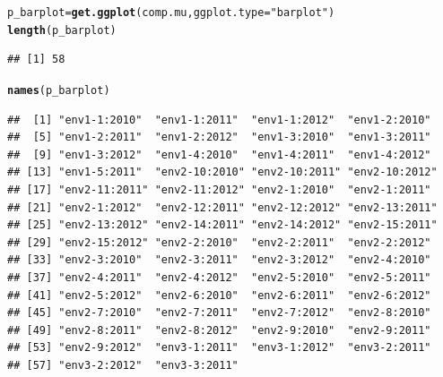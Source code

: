 \documentclass{article}\usepackage[]{graphicx}\usepackage[]{color}
\makeatletter
\newcommand{\hlstr}[1]{\textcolor[rgb]{0.192,0.494,0.8}{#1}}%
\newcommand{\hlstd}[1]{\textcolor[rgb]{0.345,0.345,0.345}{#1}}%
\newcommand{\hlkwb}[1]{\textcolor[rgb]{0.69,0.353,0.396}{#1}}%
\newcommand{\hlkwc}[1]{\textcolor[rgb]{0.333,0.667,0.333}{#1}}%
\newcommand{\hlkwd}[1]{\textcolor[rgb]{0.737,0.353,0.396}{\textbf{#1}}}%
\newenvironment{kframe}{%
 \def\at@end@of@kframe{}%
 \ifinner\ifhmode%
  \def\at@end@of@kframe{\end{minipage}}%
  \begin{minipage}{\columnwidth}%
 \fi\fi%
 \def\FrameCommand##1{\hskip\@totalleftmargin \hskip-\fboxsep
 \colorbox{shadecolor}{##1}\hskip-\fboxsep
     \hskip-\linewidth \hskip-\@totalleftmargin \hskip\columnwidth}%
 \MakeFramed {\advance\hsize-\width
   \@totalleftmargin\z@ \linewidth\hsize
   \@setminipage}}%
 {\par\unskip\endMakeFramed%
 \at@end@of@kframe}
\newenvironment{knitrout}{}{} %
\makeatother
\begin{document}
\begin{knitrout}
\color{fgcolor}\begin{kframe}
\begin{alltt}
\hlstd{p_barplot} \hlkwb{=} \hlkwd{get.ggplot}\hlstd{(comp.mu,} \hlkwc{ggplot.type} \hlstd{=} \hlstr{"barplot"}\hlstd{)}
\hlkwd{length}\hlstd{(p_barplot)}
\end{alltt}
\begin{verbatim}
## [1] 58
\end{verbatim}
\begin{alltt}
\hlkwd{names}\hlstd{(p_barplot)}
\end{alltt}
\begin{verbatim}
##  [1] "env1-1:2010"  "env1-1:2011"  "env1-1:2012"  "env1-2:2010" 
##  [5] "env1-2:2011"  "env1-2:2012"  "env1-3:2010"  "env1-3:2011" 
##  [9] "env1-3:2012"  "env1-4:2010"  "env1-4:2011"  "env1-4:2012" 
## [13] "env1-5:2011"  "env2-10:2010" "env2-10:2011" "env2-10:2012"
## [17] "env2-11:2011" "env2-11:2012" "env2-1:2010"  "env2-1:2011" 
## [21] "env2-1:2012"  "env2-12:2011" "env2-12:2012" "env2-13:2011"
## [25] "env2-13:2012" "env2-14:2011" "env2-14:2012" "env2-15:2011"
## [29] "env2-15:2012" "env2-2:2010"  "env2-2:2011"  "env2-2:2012" 
## [33] "env2-3:2010"  "env2-3:2011"  "env2-3:2012"  "env2-4:2010" 
## [37] "env2-4:2011"  "env2-4:2012"  "env2-5:2010"  "env2-5:2011" 
## [41] "env2-5:2012"  "env2-6:2010"  "env2-6:2011"  "env2-6:2012" 
## [45] "env2-7:2010"  "env2-7:2011"  "env2-7:2012"  "env2-8:2010" 
## [49] "env2-8:2011"  "env2-8:2012"  "env2-9:2010"  "env2-9:2011" 
## [53] "env2-9:2012"  "env3-1:2011"  "env3-1:2012"  "env3-2:2011" 
## [57] "env3-2:2012"  "env3-3:2011"
\end{verbatim}
\end{kframe}
\end{knitrout}
\end{document}
